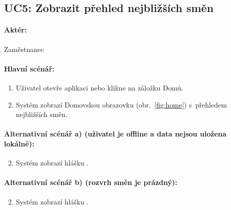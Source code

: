 \documentclass[twoside]{ctuthesis}
\begin{document}
% 	
\newpage
\subsection{UC5: Zobrazit přehled nejbližších směn}
\paragraph{Aktér:} Zaměstnanec
\paragraph{Hlavní scénář:}
\begin{enumerate}
	\item Uživatel otevře aplikaci nebo klikne na záložku Domů.
	\item Systém zobrazí Domovskou obrazovku (obr.~\ref{fig:home}) s~přehledem nejbližších směn.
\end{enumerate}


\paragraph{Alternativní scénář a) (uživatel je offline a data nejsou uložena lokálně):}
\begin{enumerate}[label=\arabic*a]
	\setcounter{enumi}{1}
	\item Systém zobrazí hlášku .
\end{enumerate}

\paragraph{Alternativní scénář b) (rozvrh směn je prázdný):}
\begin{enumerate}[label=\arabic*b]
	\setcounter{enumi}{1}
	\item Systém zobrazí hlášku .
\end{enumerate}
\end{document}
